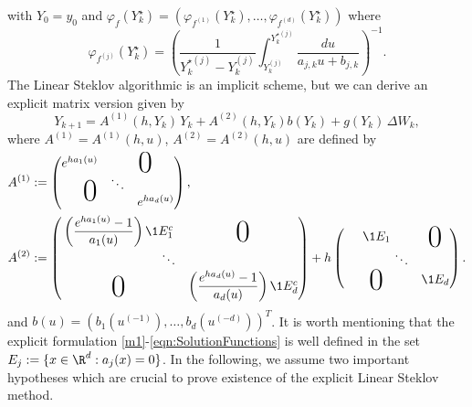 \documentclass[sort&compress, preprint]{elsarticle}
\theoremstyle{definition}
\theoremstyle{plain}%
\theoremstyle{remark}
\begin{document}
with $Y_0=y_0$ and  $	\varphi_{f}(Y_k^{\star})=
		\left(
			\varphi_{f^{(1)}}(Y_k^{\star}),
			\ldots,
			\varphi_{f^{(d)}}(Y_k^{\star})
		\right)$
where
\begin{equation}\label{fi}
	\varphi_{f^{(j)}}\left(Y_k^{\star}\right)
		=
		\left(
			\frac{1}{Y_{k}^{\star(j)}-Y_{k}^{(j)}}
			\int 
				_{Y_{k}^{(j)}}^{Y_{k}^{\star(j)}}
				\frac{du}
				{
					a_{j,k} u
					+b_{j,k}
				}
		\right)^{-1}.
\end{equation}	
The Linear Steklov algorithmic is an implicit scheme, but 
we can derive an explicit matrix version given by  
\begin{equation}\label{m1}
 Y_{k+1} = A^{(1)}(h,Y_k) \,Y_k + A^{(2)}(h,Y_k)b(Y_k)+ g(Y_k)\, \Delta W_k, 
\end{equation}
where  $A^{(1)}= A^{(1)}(h,u)$,  $A^{(2)}=A^{(2)}(h,u)$   are defined  by
\begin{align}\label{eqn:SolutionFunctions}	
	A^{(1)}&:=
		\begin{pmatrix}
			e^{ha_1(u)} & \multicolumn{2}{c}{\text{\kern0.5em\smash{\raisebox{-1ex}{\Huge 0}}}} \\
			&\ddots\\
			\multicolumn{2}{c}{\text{\kern-0.5em\smash{\raisebox{0.95ex}{\Huge 0}}}} 
			& e^{ha_d(u)}
		\end{pmatrix},
		\notag
		\\
	A^{(2)}&:=
	\begin{pmatrix}
		\left(
			\displaystyle
			\frac{e^{ha_1(u)} - 1}{a_1(u)}
		\right)\1{E_1^c}%
		&\BigZero\\
		\qquad \qquad \qquad \qquad\ddots&\\
		\BigZero&
		\left(
			\displaystyle
			\frac{e^{ha_d(u)} - 1}{a_d(u)}
		\right)\1{E_d^c}%
	\end{pmatrix}
	+h
	\begin{pmatrix}
		\1{E_1} & \BigZero\\
		\qquad \qquad \ddots\\
		\BigZero & 
		\1{E_d}
	\end{pmatrix}.	
\end{align}
 and $b(u)=\left(b_1(u^{(-1)}), \dots , b_d(u^{(-d)})\right)^T$.  
It is worth mentioning that the explicit formulation \eqref{m1}-\eqref{eqn:SolutionFunctions} 
is well defined in the set $E_j:=\{x \in \R^d: a_j(x)=0\}$. In the following, we 
assume two important hypotheses which are crucial to prove existence 
of the explicit Linear Steklov method.
\end{document}
